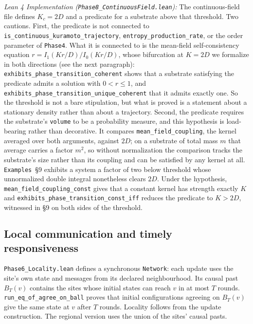 \documentclass{article}
\begin{document}
\textit{Lean 4 Implementation (\nolinkurl{Phase8_ContinuousField.lean}):} The continuous-field file defines $K_c=2D$ and a predicate for a substrate above that threshold. Two cautions. First, the predicate is not connected to \nolinkurl{is_continuous_kuramoto_trajectory}, \nolinkurl{entropy_production_rate}, or the order parameter of \texttt{Phase4}. What it is connected to is the mean-field self-consistency equation $r = I_1(Kr/D)/I_0(Kr/D)$, whose bifurcation at $K = 2D$ we formalize in both directions (see the next paragraph): \nolinkurl{exhibits_phase_transition_coherent} shows that a substrate satisfying the predicate admits a solution with $0 < r \le 1$, and \nolinkurl{exhibits_phase_transition_unique_coherent} that it admits exactly one. So the threshold is not a bare stipulation, but what is proved is a statement about a stationary density rather than about a trajectory. Second, the predicate requires the substrate's \texttt{volume} to be a probability measure, and this hypothesis is load-bearing rather than decorative. It compares \nolinkurl{mean_field_coupling}, the kernel averaged over both arguments, against $2D$; on a substrate of total mass $m$ that average carries a factor $m^2$, so without normalization the comparison tracks the substrate's size rather than its coupling and can be satisfied by any kernel at all. \texttt{Examples}~\S9 exhibits a system a factor of two below threshold whose unnormalized double integral nonetheless clears $2D$. Under the hypothesis, \nolinkurl{mean_field_coupling_const} gives that a constant kernel has strength exactly $K$ and \nolinkurl{exhibits_phase_transition_const_iff} reduces the predicate to $K > 2D$, witnessed in \S9 on both sides of the threshold.

\subsection{Local communication and timely responsiveness}
\label{sec:supp-locality}

\nolinkurl{Phase6_Locality.lean} defines a synchronous
\texttt{Network}: each update uses the site's own state and messages from its
declared neighbourhood. Its causal past $B_T(v)$ contains the sites whose
initial states can reach $v$ in at most $T$ rounds.
\nolinkurl{run_eq_of_agree_on_ball}
proves that initial configurations agreeing on $B_T(v)$ give the same state
at $v$ after $T$ rounds. Locality follows from the update construction.
The regional version uses the union of the sites' causal pasts.
\end{document}
